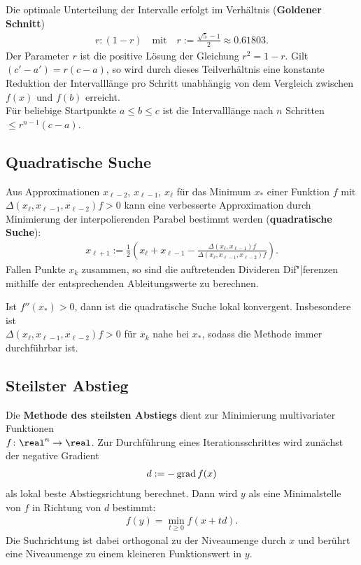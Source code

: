 \linie

Die optimale Unterteilung der Intervalle erfolgt im Verhältnis
(\textbf{Goldener Schnitt})
\begin{align*}
    r : (1 - r) \quad\text{mit}\quad
    r := \frac{\sqrt{5} - 1}{2} \approx 0.61803.
\end{align*}
Der Parameter $r$ ist die positive Lösung der Gleichung $r^2 = 1 - r$.
Gilt $(c' - a') = r(c - a)$, so wird durch dieses Teilverhältnis
eine konstante Reduktion der Intervalllänge pro Schritt unabhängig von
dem Vergleich zwischen $f(x)$ und $f(b)$ erreicht. \\
Für beliebige Startpunkte $a \le b \le c$ ist die Intervalllänge nach
$n$ Schritten $\le r^{n-1} (c - a)$.

\subsection{%
    Quadratische Suche%
}

Aus Approximationen $x_{\ell-2}$, $x_{\ell-1}$, $x_\ell$ für das
Minimum $x_\ast$ einer Funktion $f$ mit \\
$\Delta(x_\ell, x_{\ell-1}, x_{\ell-2}) f > 0$
kann eine verbesserte Approximation durch Minimierung der interpolierenden
Parabel bestimmt werden (\textbf{quadratische Suche}):
\begin{align*}
    x_{\ell+1} := \frac{1}{2} \left(x_\ell + x_{\ell-1} -
    \frac{\Delta(x_\ell, x_{\ell-1}) f}
    {\Delta(x_\ell, x_{\ell-1}, x_{\ell-2}) f}\right).
\end{align*}
Fallen Punkte $x_k$ zusammen, so sind die auftretenden Divideren Dif"|ferenzen
mithilfe der entsprechenden Ableitungswerte zu berechnen.

Ist $f''(x_\ast) > 0$, dann ist die quadratische Suche lokal konvergent.
Insbesondere ist \\
$\Delta(x_\ell, x_{\ell-1}, x_{\ell-2}) f > 0$ für $x_k$
nahe bei $x_\ast$, sodass die Methode immer durchführbar ist.

\pagebreak

\subsection{%
    Steilster Abstieg%
}

Die \textbf{Methode des steilsten Abstiegs} dient zur Minimierung multivariater
Funktionen \\
$f\colon \real^n \rightarrow \real$.
Zur Durchführung eines Iterationsschrittes wird zunächst der negative Gradient
\begin{align*}
    d := -\operatorname{grad} f(x)
\end{align*}
als lokal beste Abstiegsrichtung berechnet.
Dann wird $y$ als eine Minimalstelle von $f$ in Richtung von $d$ bestimmt:
\begin{align*}
    f(y) = \min_{t \ge 0} f(x + td).
\end{align*}
Die Suchrichtung ist dabei orthogonal zu der Niveaumenge durch $x$ und berührt
eine Niveaumenge zu einem kleineren Funktionswert in $y$.


